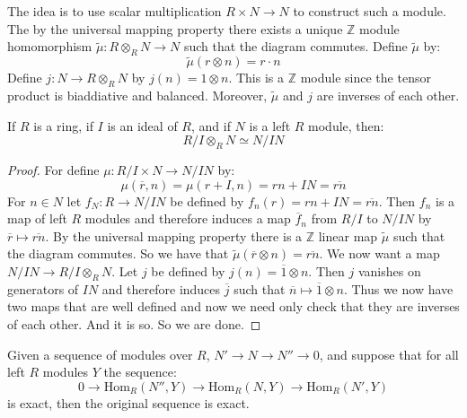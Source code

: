\documentclass[crop=false,class=article]{standalone}                           %
\begin{document}
        The idea is to use scalar multiplication $R\times{N}\rightarrow{N}$ to
        construct such a module. The by the universal mapping property there
        exists a unique $\mathbb{Z}$ module homomorphism
        $\tilde{\mu}:R\otimes_{R}N\rightarrow{N}$ such that the diagram
        commutes. Define $\tilde{\mu}$ by:
        \begin{equation}
            \tilde{\mu}(r\otimes{n})=r\cdot{n}
        \end{equation}
        Define $j:N\rightarrow{R}\otimes_{R}N$ by $j(n)=1\otimes{n}$.
        This is a $\mathbb{Z}$ module since the tensor product is biaddiative
        and balanced. Moreover, $\tilde{\mu}$ and $j$ are inverses of each
        other.
        \begin{theorem}
            If $R$ is a ring, if $I$ is an ideal of $R$, and if $N$ is a left
            $R$ module, then:
            \begin{equation}
                R/I\otimes_{R}N\simeq{N}/IN
            \end{equation}
        \end{theorem}
        \begin{proof}
            For define $\mu:R/I\times{N}\rightarrow{N}/IN$ by:
            \begin{equation}
                \mu(\overline{r},n)=\mu(r+I,n)=rn+IN=\overline{rn}
            \end{equation}
            For $n\in{N}$ let $f_{N}:R\rightarrow{N}/IN$ be defined by
            $f_{n}(r)=rn+IN=\overline{rn}$. Then $f_{n}$ is a map of left
            $R$ modules and therefore induces a map $\overline{f}_{n}$ from
            $R/I$ to $N/IN$ by $\overline{r}\mapsto\overline{rn}$. By the
            universal mapping property there is a $\mathbb{Z}$ linear map
            $\tilde{\mu}$ such that the diagram commutes. So we have that
            $\tilde{\mu}(\overline{r}\otimes{n})=\overline{rn}$. We now want a
            map $N/IN\rightarrow{R}/I\otimes_{R}N$. Let $j$ be defined by
            $j(n)=\overline{1}\otimes{n}$. Then $j$ vanishes on generators of
            $IN$ and therefore induces $\overline{j}$ such that
            $\overline{n}\mapsto\overline{1}\otimes{n}$. Thus we now have two
            maps that are well defined and now we need only check that they are
            inverses of each other. And it is so. So we are done.
        \end{proof}
        \begin{theorem}
            Given a sequence of modules over $R$,
            $N'\rightarrow{N}\rightarrow{N}''\rightarrow{0}$,
            and suppose that for all left $R$ modules $Y$ the
            sequence:
            \begin{equation}
                0\rightarrow\textrm{Hom}_{R}(N'',Y)
                \rightarrow\textrm{Hom}_{R}(N,Y)
                \rightarrow\textrm{Hom}_{R}(N',Y)
            \end{equation}
            is exact, then the original sequence is exact.
        \end{theorem}
\end{document}
